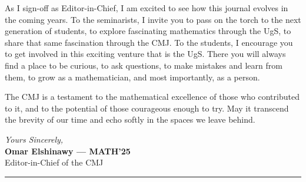 \vspace{0.1cm}

As I sign-off as Editor-in-Chief, I am excited to see how this journal evolves in
the coming years. To the seminarists, I invite you to pass on the torch to the next generation
of students, to explore fascinating mathematics through the UgS, to share that same fascination
through the {\color{cmjcrimson}CMJ}. To the students, I encourage you to get involved in this exciting venture
that is the UgS. There you will always find a place to be curious, to ask questions, to make mistakes 
and learn from them, to grow as a mathematician, and most importantly, as a person.

The {\color{cmjcrimson}CMJ} is a testament to the mathematical excellence of those who
contributed to it, and to the potential of those courageous enough to try. 
May it transcend the brevity of our time and echo softly in the spaces we leave behind.

\vspace{0.4cm}

\noindent\textit{Yours Sincerely, }\\
\textbf{Omar Elshinawy --- MATH'25}\\
Editor-in-Chief of the \textcolor{cmjcrimson}{CMJ}
\vspace{0.15cm}

\noindent\textcolor{cmjgold}{\rule{\textwidth}{1.2pt}}

\vspace{0.6cm}